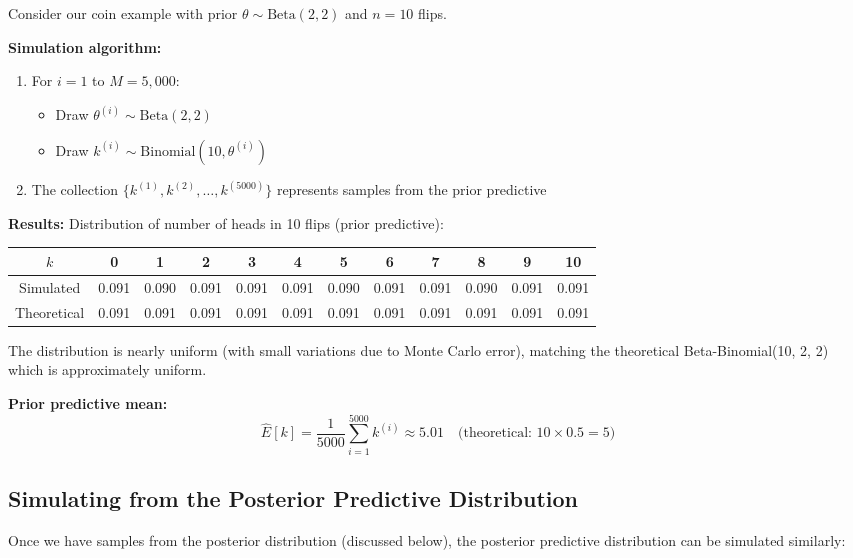\begin{examplebox}
\begin{example}
Consider our coin example with prior $\theta \sim \text{Beta}(2,2)$ and $n=10$ flips.

\textbf{Simulation algorithm:}
\begin{enumerate}
\item For $i = 1$ to $M = 5{,}000$:
\begin{itemize}
\item Draw $\theta^{(i)} \sim \text{Beta}(2,2)$
\item Draw $k^{(i)} \sim \text{Binomial}(10, \theta^{(i)})$
\end{itemize}
\item The collection $\{k^{(1)}, k^{(2)}, \dots, k^{(5000)}\}$ represents samples from the prior predictive
\end{enumerate}

\textbf{Results:}
Distribution of number of heads in 10 flips (prior predictive):
\begin{center}
\footnotesize
\begin{tabular}{c|ccccccccccc}
\toprule
$k$ & 0 & 1 & 2 & 3 & 4 & 5 & 6 & 7 & 8 & 9 & 10 \\
\midrule
Simulated & 0.091 & 0.090 & 0.091 & 0.091 & 0.091 & 0.090 & 0.091 & 0.091 & 0.090 & 0.091 & 0.091 \\
Theoretical & 0.091 & 0.091 & 0.091 & 0.091 & 0.091 & 0.091 & 0.091 & 0.091 & 0.091 & 0.091 & 0.091 \\
\bottomrule
\end{tabular}
\end{center}
The distribution is nearly uniform (with small variations due to Monte Carlo error), matching the theoretical Beta-Binomial(10, 2, 2) which is approximately uniform.

\textbf{Prior predictive mean:}
$$\hat{E}[k] = \frac{1}{5000}\sum_{i=1}^{5000} k^{(i)} \approx 5.01 \quad \text{(theoretical: } 10 \times 0.5 = 5\text{)}$$
\end{example}
\end{examplebox}

\subsection{Simulating from the Posterior Predictive Distribution}
Once we have samples from the posterior distribution (discussed below), the posterior predictive distribution can be simulated similarly:


